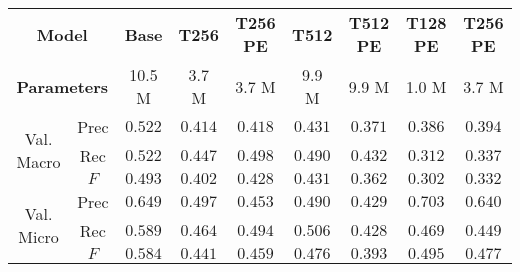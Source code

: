 \begin{tabular}{cc|ccccccc}
    \multicolumn{2}{c|}{\textbf{Model}} & \textbf{Base} & \textbf{T256} & \textbf{T256 PE} & \textbf{T512} & \textbf{T512 PE} & \textbf{T128 PE} & \textbf{T256 PE}\\
    \multicolumn{2}{c|}{\textbf{Parameters}} & 10.5 M & 3.7 M & 3.7 M & 9.9 M & 9.9 M & 1.0 M & 3.7 M \\\hline
    \multirow{3}{*}{Val. Macro} & Prec & $\mathbf{0.522}$ & $0.414$ & $0.418$ & $0.431$ & $0.371$ & $0.386$ & $0.394$ \\
    & Rec  & $\mathbf{0.522}$ & $0.447$ & $0.498$ & $0.490$ & $0.432$ & $0.312$          & $0.337$ \\
    & $F$  & $\mathbf{0.493}$ & $0.402$ & $0.428$ & $0.431$ & $0.362$ & $0.302$          & $0.332$ \\\hline
    \multirow{3}{*}{Val. Micro} & Prec & $0.649$          & $0.497$ & $0.453$ & $0.490$ & $0.429$ & $\mathbf{0.703}$ & $0.640$ \\
    & Rec  & $\mathbf{0.589}$ & $0.464$ & $0.494$ & $0.506$ & $0.428$ & $0.469$          & $0.449$ \\
    & $F$  & $\mathbf{0.584}$ & $0.441$ & $0.459$ & $0.476$ & $0.393$ & $0.495$          & $0.477$ \\
\end{tabular}